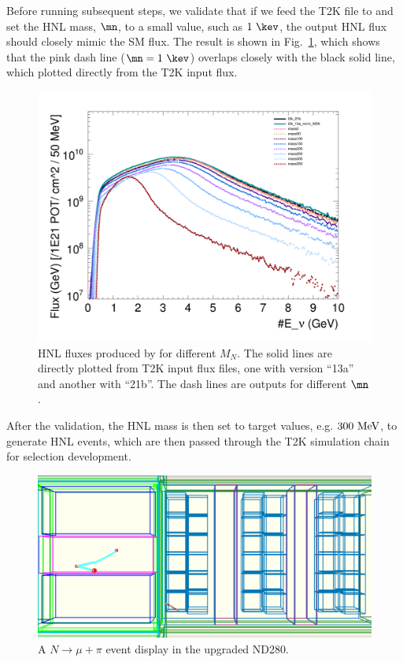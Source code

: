         Before running subsequent steps, we validate that if we feed the T2K  file to  and set the HNL mass, $\mn$, to a small value, such as $1~\kev$, the output HNL flux should closely mimic the SM flux. 
        The result is shown in Fig.~\ref{fig:hnl-fluxes}, which shows that the pink dash line ($\mn=1~\kev$) overlaps closely with the black solid line, which plotted directly from the T2K input flux.  
        \begin{figure}[!htb] 
            \centering 		
            \includegraphics[width=\sgfigwid\textwidth]{figures/hnl_fluxes.png}
            \caption{\label{fig:hnl-fluxes} HNL fluxes produced by  for different $M_N$. The solid lines are directly plotted from T2K input flux files, one with version ``13a'' and another with ``21b''. The dash lines are  outputs for different $\mn$.} 
        \end{figure}
        After the validation, the HNL mass is then set to target values, e.g. $300~\textrm{MeV}$, to generate HNL events, which are then passed through the T2K simulation chain for selection development. 
        \begin{figure}[!htb] 
            \centering 		
            \includegraphics[width=\sgfigwid\textwidth]{figures/HNLEveDIs.png}
            \caption{\label{fig:hnl-evedis} A $N\rightarrow\mu+\pi$ event display in the upgraded ND280.} 
        \end{figure}

